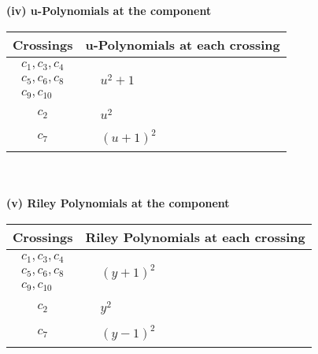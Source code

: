 \documentclass[1p]{elsarticle_modified}
\theoremstyle{definition}
\begin{document}
\newpage\renewcommand{\arraystretch}{1}
\flushleft \textbf{(iv) u-Polynomials at the component}\newline \\
\begin{tabular}{m{50pt}|m{274pt}}
Crossings & \hspace{64pt}u-Polynomials at each crossing \\
\hline $$\begin{aligned}c_{1},c_{3},c_{4}\\c_{5},c_{6},c_{8}\\c_{9},c_{10}\end{aligned}$$&$\begin{aligned}
&u^2+1
\end{aligned}$\\
\hline $$\begin{aligned}c_{2}\end{aligned}$$&$\begin{aligned}
&u^2
\end{aligned}$\\
\hline $$\begin{aligned}c_{7}\end{aligned}$$&$\begin{aligned}
&(u+1)^2
\end{aligned}$\\
\hline
\end{tabular}\\~\\
\newpage\renewcommand{\arraystretch}{1}
\flushleft \textbf{(v) Riley Polynomials at the component}\newline \\
\begin{tabular}{m{50pt}|m{274pt}}
Crossings & \hspace{64pt}Riley Polynomials at each crossing \\
\hline $$\begin{aligned}c_{1},c_{3},c_{4}\\c_{5},c_{6},c_{8}\\c_{9},c_{10}\end{aligned}$$&$\begin{aligned}
&(y+1)^2
\end{aligned}$\\
\hline $$\begin{aligned}c_{2}\end{aligned}$$&$\begin{aligned}
&y^2
\end{aligned}$\\
\hline $$\begin{aligned}c_{7}\end{aligned}$$&$\begin{aligned}
&(y-1)^2
\end{aligned}$\\
\hline
\end{tabular}\\~\\
\end{document}
